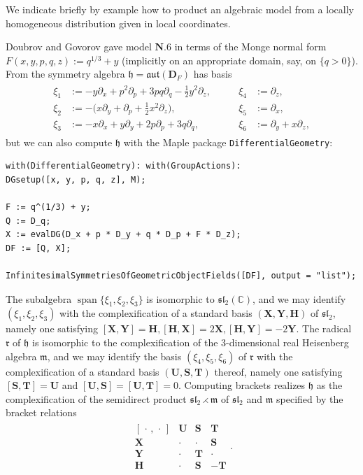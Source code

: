 \documentclass[pdftex]{sigma}
\DeclareMathOperator{\spanOperator}{span}
\newcommand{\Span}[1]{\spanOperator\{{#1}\}}
\newcommand{\bbC}{\mathbb{C}}
\newcommand{\mbD}{\mathbf{D}}
\newcommand{\mbH}{\mathbf{H}}
\newcommand{\mbS}{\mathbf{S}}
\newcommand{\mbT}{\mathbf{T}}
\newcommand{\mbU}{\mathbf{U}}
\newcommand{\mbX}{\mathbf{X}}
\newcommand{\mbY}{\mathbf{Y}}
\newcommand{\mfh} {\mathfrak{h}}
\newcommand{\mfm} {\mathfrak{m}}
\newcommand{\mfr} {\mathfrak{r}}
\newcommand{\mfaut}{\mathfrak{aut}}
\newcommand{\mfsl} {\mathfrak{sl}}
\numberwithin{equation}{section}
\begin{document}
\begin{Example}\label{example:coordinates-to-distribution}
We indicate briefly by example how to product an algebraic model from a locally homogeneous distribution given in local coordinates.

Doubrov and Govorov gave model $\mathbf{N.6}$ in terms of the Monge normal form $F(x, y, p, q, z) := q^{1 / 3} + y$ (implicitly on an appropriate domain, say, on $\{q > 0\}$). From \cite{DoubrovGovorovCounterexample} the symmetry algebra $\mfh = \mfaut(\mbD_F)$ has basis
\begin{gather}
\begin{alignedat}{4}\label{equation:N.6-symmetries}
	\xi_1 &:= -y \partial_x + p^2 \partial_p + 3 p q \partial_q - \tfrac{1}{2} y^2 \partial_z , \qquad &
	\xi_4 &:= \partial_z , \\
	\xi_2 &:= -\big(x \partial_y + \partial_p + \tfrac{1}{2} x^2 \partial_z\big) , \qquad &
	\xi_5 &:= \partial_x , \\
	\xi_3 &:= -x \partial_x + y \partial_y + 2 p \partial_p + 3 q \partial_q , \qquad &
	\xi_6 &:= \partial_y + x \partial_z ,
\end{alignedat}
\end{gather}
but we can also compute $\mfh$ with the Maple package \texttt{DifferentialGeometry}:

\begin{Verbatim}[frame = single, xleftmargin=0.8cm, xrightmargin=0.8cm]
with(DifferentialGeometry): with(GroupActions):
DGsetup([x, y, p, q, z], M);

F := q^(1/3) + y;
Q := D_q;
X := evalDG(D_x + p * D_y + q * D_p + F * D_z);
DF := [Q, X];

InfinitesimalSymmetriesOfGeometricObjectFields([DF], output = "list");
\end{Verbatim}

The subalgebra $\Span{\xi_1, \xi_2, \xi_3}$ is isomorphic to $\mfsl_2(\bbC)$, and we may identify $(\xi_1, \xi_2, \xi_3)$ with the complexification of a standard basis $(\mbX, \mbY, \mbH)$ of $\mfsl_2$, namely one satisfying $[\mbX, \mbY] = \mbH, [\mbH, \mbX] = 2 \mbX, [\mbH, \mbY] = -2 \mbY$. The radical $\mfr$ of $\mfh$ is isomorphic to the complexification of the $3$-dimensional real Heisenberg algebra $\mfm$, and we may identify the basis $(\xi_4, \xi_5, \xi_6)$ of $\mfr$ with the complexification of a standard basis $(\mbU, \mbS, \mbT)$ thereof, namely one satisfying $[\mbS, \mbT] = \mbU$ and $[\mbU, \mbS] = [\mbU, \mbT] = 0$. Computing brackets realizes $\mfh$ as the complexification of the semidirect product $\mfsl_2 \rightthreetimes \mfm$ of $\mfsl_2$ and $\mfm$ specified by the bracket relations
\begin{gather*}
	\begin{array}{c|ccc}
		[\,\cdot\,,\,\cdot\,] & \mbU & \mbS &\mbT \\
		\hline
		\mbX & \cdot & \cdot & \mbS \\
		\mbY & \cdot & \mbT & \cdot \\
		\mbH & \cdot & \mbS & -\mbT
	\end{array} .
\end{gather*}


\end{Example}
\end{document}

